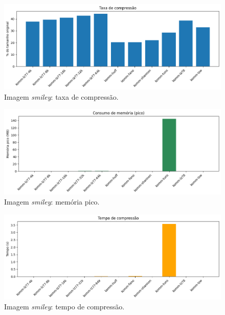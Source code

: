 \begin{figure}[h]
  \centering
  \caption{Imagem \textit{smiley}: taxa de compressão.}
  \label{fig:komm-smiley-compression}
  \includegraphics[width=15cm]{figuras/komm_smiley_compression.png}
\end{figure}

\begin{figure}[ht]
  \centering
  \caption{Imagem \textit{smiley}: memória pico.}
  \label{fig:komm-smiley-memory}
  \includegraphics[width=15cm]{figuras/komm_smiley_memory.png}
\end{figure}

\begin{figure}[ht]
  \centering
  \caption{Imagem \textit{smiley}: tempo de compressão.}
  \label{fig:komm-smiley-time}
  \includegraphics[width=15cm]{figuras/komm_smiley_time.png}
\end{figure}

